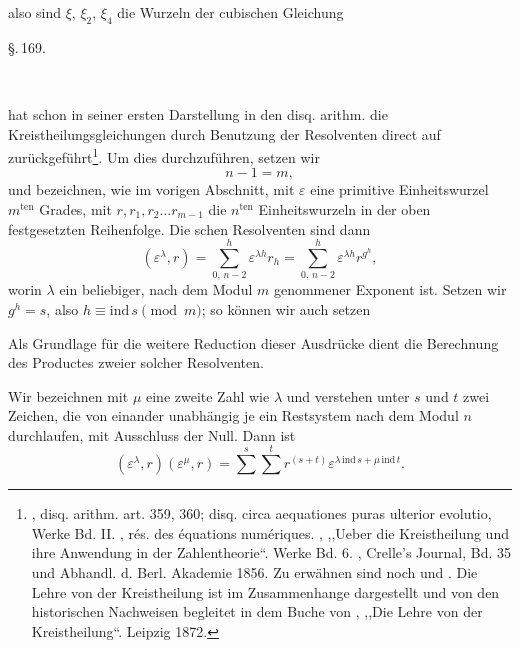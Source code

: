also sind $\xi$, $\xi_2$, $\xi_4$ die Wurzeln der cubischen Gleichung

\begin{center}
\S.\,169.

\\
\end{center}

 hat schon in seiner ersten Darstellung in den disq.
arithm. die Kreistheilungsgleichungen durch Benutzung der Resolventen
direct auf  zur\"uckgef\"uhrt\footnote{, disq. arithm. art. 359, 360; disq. circa aequationes puras ulterior evolutio, Werke Bd. II. , r\'es. des \'equations num\'eriques. , ,,Ueber die Kreistheilung und ihre Anwendung in der Zahlentheorie``. Werke Bd. 6. , Crelle's Journal, Bd. 35 und Abhandl. d. Berl. Akademie 1856. Zu erw\"ahnen sind noch  und . Die Lehre von der Kreistheilung ist im Zusammenhange dargestellt und von den historischen Nachweisen begleitet in dem Buche von , ,,Die Lehre von der Kreistheilung``. Leipzig 1872.}. Um
dies durchzuf\"uhren, setzen wir
\[ n - 1 = m, \]
und bezeichnen, wie im vorigen Abschnitt, mit $\varepsilon$ eine primitive
Einheitswurzel $m^{\mathrm{ten}}$ Grades, mit $r, r_1, r_2 \ldots r_{m-1}$ die $n^{\mathrm{ten}}$ Einheitswurzeln
 in der oben festgesetzten Reihenfolge. Die schen
Resolventen sind dann
\[ (\varepsilon^\lambda, r) = \sum_{0,\,n-2}^{h} \varepsilon^{\lambda h} r_h = \sum_{0,\,n-2}^{h} \varepsilon^{\lambda h} r^{g^h}, \]
worin $\lambda$ ein beliebiger, nach dem Modul $m$ genommener Exponent
 ist.
Setzen wir $g^h = s$, also $h \equiv \mathrm{ind}\,s \pmod{m}$; so k\"onnen wir
auch setzen

Als Grundlage f\"ur die weitere Reduction dieser Ausdr\"ucke
dient die Berechnung des Productes zweier solcher Resolventen.

Wir bezeichnen mit $\mu$ eine zweite Zahl wie $\lambda$ und verstehen
unter $s$ und $t$ zwei Zeichen, die von einander unabh\"angig je
ein Restsystem nach dem Modul $n$ durchlaufen, mit Ausschluss
der Null.
Dann ist
\[ (\varepsilon^\lambda, r)(\varepsilon^\mu, r) = \sum^{s} \sum^{t} r^{(s+t)} \varepsilon^{\lambda\,\mathrm{ind}\,s + \mu\,\mathrm{ind}\,t}. \]
